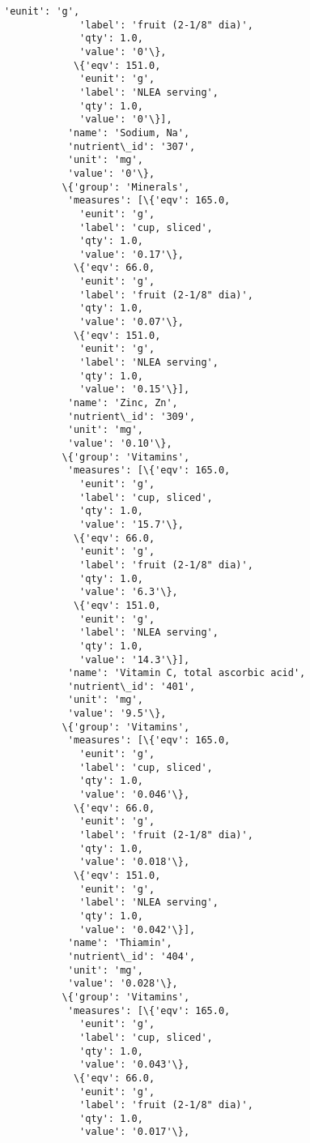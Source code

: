 \documentclass[11pt]{article}
\begin{document}
\begin{Verbatim}[commandchars=\\\{\}]
             'eunit': 'g',
             'label': 'fruit (2-1/8" dia)',
             'qty': 1.0,
             'value': '0'\},
            \{'eqv': 151.0,
             'eunit': 'g',
             'label': 'NLEA serving',
             'qty': 1.0,
             'value': '0'\}],
           'name': 'Sodium, Na',
           'nutrient\_id': '307',
           'unit': 'mg',
           'value': '0'\},
          \{'group': 'Minerals',
           'measures': [\{'eqv': 165.0,
             'eunit': 'g',
             'label': 'cup, sliced',
             'qty': 1.0,
             'value': '0.17'\},
            \{'eqv': 66.0,
             'eunit': 'g',
             'label': 'fruit (2-1/8" dia)',
             'qty': 1.0,
             'value': '0.07'\},
            \{'eqv': 151.0,
             'eunit': 'g',
             'label': 'NLEA serving',
             'qty': 1.0,
             'value': '0.15'\}],
           'name': 'Zinc, Zn',
           'nutrient\_id': '309',
           'unit': 'mg',
           'value': '0.10'\},
          \{'group': 'Vitamins',
           'measures': [\{'eqv': 165.0,
             'eunit': 'g',
             'label': 'cup, sliced',
             'qty': 1.0,
             'value': '15.7'\},
            \{'eqv': 66.0,
             'eunit': 'g',
             'label': 'fruit (2-1/8" dia)',
             'qty': 1.0,
             'value': '6.3'\},
            \{'eqv': 151.0,
             'eunit': 'g',
             'label': 'NLEA serving',
             'qty': 1.0,
             'value': '14.3'\}],
           'name': 'Vitamin C, total ascorbic acid',
           'nutrient\_id': '401',
           'unit': 'mg',
           'value': '9.5'\},
          \{'group': 'Vitamins',
           'measures': [\{'eqv': 165.0,
             'eunit': 'g',
             'label': 'cup, sliced',
             'qty': 1.0,
             'value': '0.046'\},
            \{'eqv': 66.0,
             'eunit': 'g',
             'label': 'fruit (2-1/8" dia)',
             'qty': 1.0,
             'value': '0.018'\},
            \{'eqv': 151.0,
             'eunit': 'g',
             'label': 'NLEA serving',
             'qty': 1.0,
             'value': '0.042'\}],
           'name': 'Thiamin',
           'nutrient\_id': '404',
           'unit': 'mg',
           'value': '0.028'\},
          \{'group': 'Vitamins',
           'measures': [\{'eqv': 165.0,
             'eunit': 'g',
             'label': 'cup, sliced',
             'qty': 1.0,
             'value': '0.043'\},
            \{'eqv': 66.0,
             'eunit': 'g',
             'label': 'fruit (2-1/8" dia)',
             'qty': 1.0,
             'value': '0.017'\},

\end{Verbatim}
\end{document}
